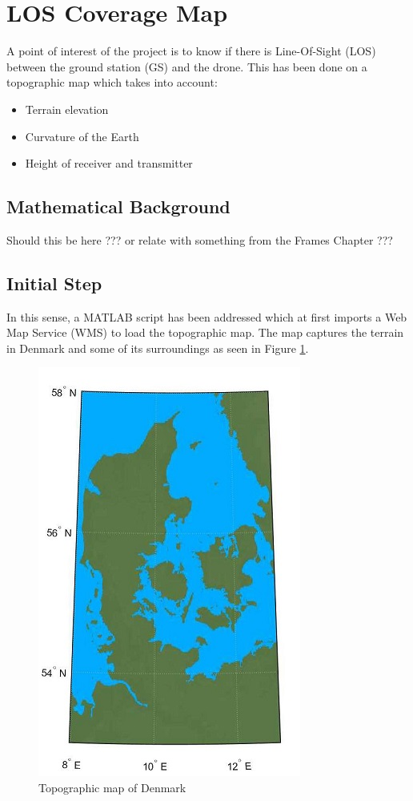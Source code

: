 \section{LOS Coverage Map}\label{sec:los_map}
A point of interest of the project is to know if there is Line-Of-Sight (LOS) between the ground station (GS) and the drone. This has been done on a topographic map which takes into account:

\begin{itemize}
	\item Terrain elevation
	\item Curvature of the Earth
	\item Height of receiver and transmitter
\end{itemize}

\subsection{Mathematical Background}
Should this be here ??? or relate with something from the Frames Chapter ???

\subsection{Initial Step}
In this sense, a MATLAB script has been addressed which at first imports a Web Map Service (WMS) to load the topographic map. The map captures the terrain in Denmark and some of its surroundings as seen in Figure \ref{fig:dk_map}.

\begin{figure}[h]
	\centering
	\includegraphics[scale=2]{figures/denmark.jpg}
	\caption{Topographic map of Denmark}
   	\label{fig:dk_map}
\end{figure}

